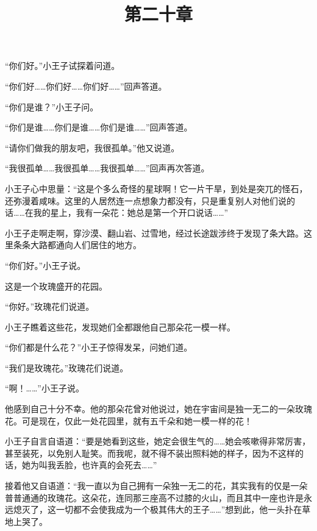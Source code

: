 “你们好。”小王子试探着问道。

“你们好\ldots{}\ldots{}你们好\ldots{}\ldots{}你们好\ldots{}\ldots{}”回声答道。

“你们是谁？”小王子问。

“你们是谁\ldots{}\ldots{}你们是谁\ldots{}\ldots{}你们是谁\ldots{}\ldots{}”回声答道。

“请你们做我的朋友吧，我很孤单。”他又说道。

“我很孤单\ldots{}\ldots{}我很孤单\ldots{}\ldots{}我很孤单\ldots{}\ldots{}”回声再次答道。

小王子心中思量：“这是个多么奇怪的星球啊！它一片干旱，到处是突兀的怪石，还弥漫着咸味。这里的人居然连一点想象力都没有，只是重复别人对他们说的话\ldots{}\ldots{}在我的星上，我有一朵花：她总是第一个开口说话\ldots{}\ldots{}”

\title{第二十章}

小王子走啊走啊，穿沙漠、翻山岩、过雪地，经过长途跋涉终于发现了条大路。这里条条大路都通向人们居住的地方。

“你们好。”小王子说。

这是一个玫瑰盛开的花园。

“你好。”玫瑰花们说道。

{\startalignment[center]
 \stopalignment}

小王子瞧着这些花，发现她们全都跟他自己那朵花一模一样。

“你们都是什么花？”小王子惊得发呆，问她们道。

“我们是玫瑰花。”玫瑰花们说道。

“啊！\ldots{}\ldots{}”小王子说。

他感到自己十分不幸。他的那朵花曾对他说过，她在宇宙间是独一无二的一朵玫瑰花。可是现在，仅此一处花园里，就有五千朵和她一模一样的花！

小王子自言自语道：“要是她看到这些，她定会很生气的\ldots{}\ldots{}她会咳嗽得非常厉害，甚至装死，以免别人耻笑。而我呢，就不得不装出照料她的样子，因为不这样的话，她为叫我丢脸，也许真的会死去\ldots{}\ldots{}”

接着他又自语道：“我一直以为自己拥有一朵独一无二的花，其实我有的仅是一朵普普通通的玫瑰花。这朵花，连同那三座高不过膝的火山，而且其中一座也许是永远熄灭了，这一切都不会使我成为一个极其伟大的王子\ldots{}\ldots{}”想到此，他一头扑在草地上哭了。

{\startalignment[center]
 \stopalignment}

